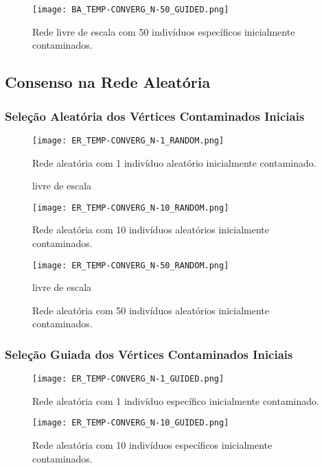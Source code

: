 \documentclass{article}
\begin{document}
\begin{figure}[H]
  \centerline{\texttt{[image: BA\_TEMP-CONVERG\_N-50\_GUIDED.png]}}
  \caption{Rede livre de escala com 50 indivíduos específicos inicialmente contaminados.}
  \label{fig:boat1}
\end{figure}

\subsection{Consenso na Rede Aleatória}

\subsubsection{Seleção Aleatória dos Vértices Contaminados Iniciais}

\begin{figure}[H]
  \centerline{\texttt{[image: ER\_TEMP-CONVERG\_N-1\_RANDOM.png]}}
  \caption{Rede aleatória com 1 indivíduo aleatório inicialmente contaminado.}
  \label{fig:boat1}
\end{figure}

\begin{figure}[H]livre de escala
  \centerline{\texttt{[image: ER\_TEMP-CONVERG\_N-10\_RANDOM.png]}}
  \caption{Rede aleatória com 10 indivíduos aleatórios inicialmente contaminados.}
  \label{fig:boat1}
\end{figure}

\begin{figure}[H]
  \centerline{\texttt{[image: ER\_TEMP-CONVERG\_N-50\_RANDOM.png]}}
  \caption{Rede aleatória com 50 indivíduos aleatórios inicialmente contaminados.}livre de escala
  \label{fig:boat1}
\end{figure}

\subsubsection{Seleção Guiada dos Vértices Contaminados Iniciais}

\begin{figure}[H]
  \centerline{\texttt{[image: ER\_TEMP-CONVERG\_N-1\_GUIDED.png]}}
  \caption{Rede aleatória com 1 indivíduo específico inicialmente contaminado.}
  \label{fig:boat1}
\end{figure}

\begin{figure}[H]
  \centerline{\texttt{[image: ER\_TEMP-CONVERG\_N-10\_GUIDED.png]}}
  \caption{Rede aleatória com 10 indivíduos específicos inicialmente contaminados.}
  \label{fig:boat1}
\end{figure}
\end{document}

